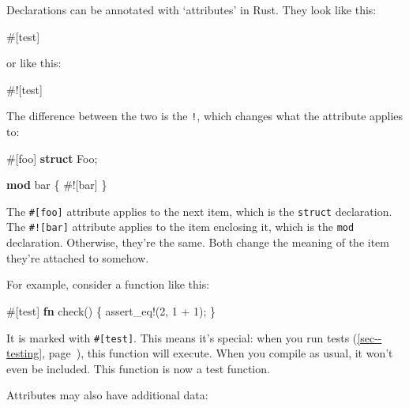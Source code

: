 \documentclass[a4paper,]{book}
\renewcommand*{\hyperref}[2][\ar]{%
  \def\ar{#2}%
  #2 (\autoref{#1}, page~\pageref{#1})}
\newenvironment{Shaded}{\begin{snugshade}}{\end{snugshade}}
\newcommand{\KeywordTok}[1]{\textcolor[rgb]{0.13,0.29,0.53}{\textbf{{#1}}}}
\newcommand{\DecValTok}[1]{\textcolor[rgb]{0.00,0.00,0.81}{{#1}}}
\newcommand{\OtherTok}[1]{\textcolor[rgb]{0.56,0.35,0.01}{{#1}}}
\newcommand{\NormalTok}[1]{{#1}}
\begin{document}
Declarations can be annotated with `attributes' in Rust. They look like
this:

\begin{Shaded}
\begin{Highlighting}[]
\OtherTok{#[}\NormalTok{test}\OtherTok{]}
\end{Highlighting}
\end{Shaded}

or like this:

\begin{Shaded}
\begin{Highlighting}[]
\NormalTok{#![test]}
\end{Highlighting}
\end{Shaded}

The difference between the two is the \texttt{!}, which changes what the
attribute applies to:

\begin{Shaded}
\begin{Highlighting}[]
\OtherTok{#[}\NormalTok{foo}\OtherTok{]}
\KeywordTok{struct} \NormalTok{Foo;}

\KeywordTok{mod} \NormalTok{bar \{}
    \NormalTok{#![bar]}
\NormalTok{\}}
\end{Highlighting}
\end{Shaded}

The \texttt{\#{[}foo{]}} attribute applies to the next item, which is
the \texttt{struct} declaration. The \texttt{\#!{[}bar{]}} attribute
applies to the item enclosing it, which is the \texttt{mod} declaration.
Otherwise, they're the same. Both change the meaning of the item they're
attached to somehow.

For example, consider a function like this:

\begin{Shaded}
\begin{Highlighting}[]
\OtherTok{#[}\NormalTok{test}\OtherTok{]}
\KeywordTok{fn} \NormalTok{check() \{}
    \OtherTok{assert_eq!}\NormalTok{(}\DecValTok{2}\NormalTok{, }\DecValTok{1} \NormalTok{+ }\DecValTok{1}\NormalTok{);}
\NormalTok{\}}
\end{Highlighting}
\end{Shaded}

It is marked with \texttt{\#{[}test{]}}. This means it's special: when
you run \hyperref[sec--testing]{tests}, this function will execute. When
you compile as usual, it won't even be included. This function is now a
test function.

Attributes may also have additional data:
\end{document}
